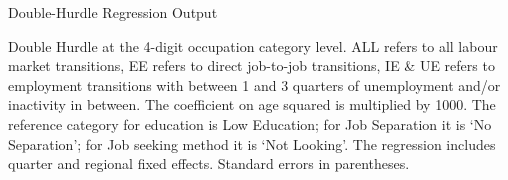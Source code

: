 \documentclass[12pt,authoryear]{elsarticle}
\begin{document}
	\newpage
	\thispagestyle{empty}
	\begin{table}[htbp]
		\centering
		\caption{Double-Hurdle Regression Output}\label{tab:TobitResults}
		\begin{adjustbox}{width=\textwidth}
			\begin{threeparttable}
				
				
				\begin{tablenotes}
					\item{\footnotesize{Double Hurdle at the 4-digit occupation category level. ALL refers to all labour market transitions, EE refers to direct job-to-job transitions, IE \& UE refers to employment transitions with between 1 and 3 quarters of unemployment and/or inactivity in between. The coefficient on age squared is multiplied by 1000. The reference category for education is Low Education; for Job Separation it is `No Separation';  for Job seeking method it is `Not Looking'. The regression includes quarter and regional fixed effects. Standard errors in parentheses.}}
				\end{tablenotes}
			\end{threeparttable}
		\end{adjustbox}
	\end{table}
	\restoregeometry %
	\newpage
	
\end{document}
